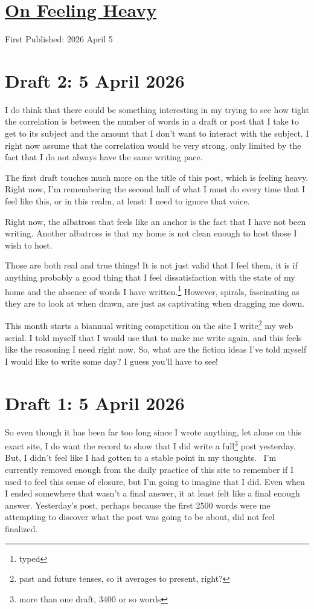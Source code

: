 \documentclass[12pt]{article}
\renewcommand{\,}{\textsuperscript{,}}
\begin{document}
  
\doublespacing  
\section{\href{feeling-heavy.html}{On Feeling Heavy}}  
First Published: 2026 April 5

\section{Draft 2: 5 April 2026}

I do think that there could be something interesting in my trying to see how tight the correlation is between the number of words in a draft or post that I take to get to its subject and the amount that I don't want to interact with the subject.  
I right now assume that the correlation would be very strong, only limited by the fact that I do not always have the same writing pace.

The first draft touches much more on the title of this post, which is feeling heavy.  
Right now, I'm remembering the second half of what I must do every time that I feel like this, or in this realm, at least: I need to ignore that voice.

Right now, the albatross that feels like an anchor is the fact that I have not been writing.  
Another albatross is that my home is not clean enough to host those I wish to host.

Those are both real and true things!  
It is not just valid that I feel them, it is if anything probably a good thing that I feel dissatisfaction with the state of my home and the absence of words I have written.\footnote{typed}  
However, spirals, fascinating as they are to look at when drawn, are just as captivating when dragging me down.

This month starts a biannual writing competition on the site I write\footnote{past and future tenses, so it averages to present, right?} my web serial.  
I told myself that I would use that to make me write again, and this feels like the reasoning I need right now.  
So, what are the fiction ideas I've told myself I would like to write some day?  
I guess you'll have to see!

\section{Draft 1: 5 April 2026}

So even though it has been far too long since I wrote anything, let alone on this exact site, I do want the record to show that I did write a full\footnote{more than one draft, 3400 or so words} post yesterday.  
But, I didn't feel like I had gotten to a stable point in my thoughts.   
I'm currently removed enough from the daily practice of this site to remember if I used to feel this sense of closure, but I'm going to imagine that I did.  
Even when I ended somewhere that wasn't a final answer, it at least felt like a final enough answer.  
Yesterday's post, perhaps because the first 2500 words were me attempting to discover what the post was going to be about, did not feel finalized.
\end{document}
